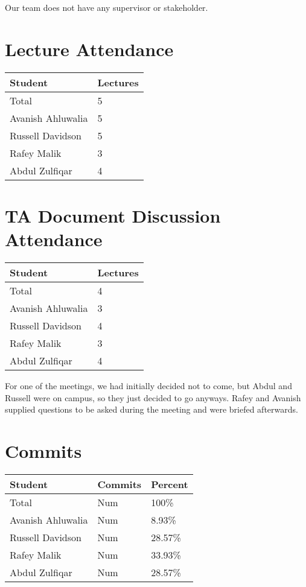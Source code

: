 \documentclass{article}
\begin{document}
Our team does not have any supervisor or stakeholder.

\section{Lecture Attendance}

\begin{table}[H]
\centering
\begin{tabular}{ll}
\toprule
\textbf{Student} & \textbf{Lectures}\\
\midrule
Total & 5\\
Avanish Ahluwalia & 5\\
Russell Davidson & 5\\
Rafey Malik & 3\\
Abdul Zulfiqar & 4\\
\bottomrule
\end{tabular}
\end{table}

\section{TA Document Discussion Attendance}

\begin{table}[H]
\centering
\begin{tabular}{ll}
\toprule
\textbf{Student} & \textbf{Lectures}\\
\midrule
Total & 4\\
Avanish Ahluwalia & 3\\
Russell Davidson & 4\\
Rafey Malik & 3\\
Abdul Zulfiqar & 4\\
\bottomrule
\end{tabular}
\end{table}

For one of the meetings, we had initially decided not to come, but Abdul and Russell were on campus, so they just decided to go anyways. Rafey and Avanish supplied questions to be asked during the meeting and were briefed afterwards.

\section{Commits}

\begin{table}[H]
\centering
\begin{tabular}{lll}
\toprule
\textbf{Student} & \textbf{Commits} & \textbf{Percent}\\
\midrule
Total & Num & 100\% \\
Avanish Ahluwalia & Num & 8.93\% \\
Russell Davidson & Num & 28.57\% \\
Rafey Malik & Num & 33.93\% \\
Abdul Zulfiqar & Num & 28.57\% \\
\bottomrule
\end{tabular}
\end{table}
\end{document}
